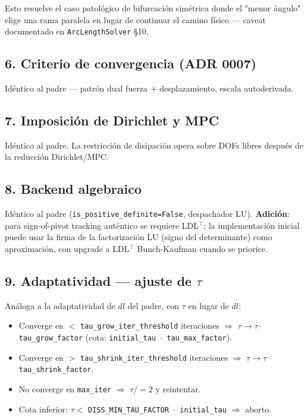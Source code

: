 \documentclass[11pt,letterpaper,oneside]{report}
\begin{document}
Esto resuelve el caso patológico de bifurcación simétrica donde el "menor ángulo" elige una rama paralela en lugar de continuar el camino físico --- caveat documentado en \texttt{ArcLengthSolver} §10.

\subsection{6. Criterio de convergencia (ADR 0007)}

Idéntico al padre --- patrón dual fuerza + desplazamiento, escala autoderivada.

\subsection{7. Imposición de Dirichlet y MPC}

Idéntico al padre. La restricción de disipación opera sobre DOFs libres después de la reducción Dirichlet/MPC.

\subsection{8. Backend algebraico}

Idéntico al padre (\texttt{is\_positive\_definite=False}, despachador LU). \textbf{Adición}: para sign-of-pivot tracking auténtico se requiere LDL\ensuremath{^{\top}}; la implementación inicial puede usar la firma de la factorización LU (signo del determinante) como aproximación, con upgrade a LDL\ensuremath{^{\top}} Bunch-Kaufman cuando se priorice.

\subsection{9. Adaptatividad --- ajuste de $\tau$}

Análoga a la adaptatividad de $dl$ del padre, con $\tau$ en lugar de $dl$:

\begin{itemize}
  \item Converge en $<$ \texttt{tau\_grow\_iter\_threshold} iteraciones \ensuremath{\Rightarrow} $\tau \to \tau \cdot $ \texttt{tau\_grow\_factor} (cota: \texttt{initial\_tau \ensuremath{\cdot} tau\_max\_factor}).
  \item Converge en $>$ \texttt{tau\_shrink\_iter\_threshold} iteraciones \ensuremath{\Rightarrow} $\tau \to \tau \cdot $ \texttt{tau\_shrink\_factor}.
  \item No converge en \texttt{max\_iter} \ensuremath{\Rightarrow} $\tau /= 2$ y reintentar.
  \item Cota inferior: $\tau < $ \texttt{DISS\_MIN\_TAU\_FACTOR \ensuremath{\cdot} initial\_tau} \ensuremath{\Rightarrow} aborto.
\end{itemize}
\end{document}
